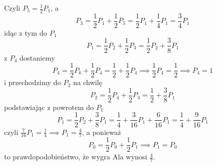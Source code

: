 \begin{solution}
  Czyli $P_5=\frac{1}{2}P_1$, a 
  $$P_3=\frac{1}{2}P_1+\frac{1}{2}P_5=\frac{1}{2}P_1+\frac{1}{4}P_1=\frac{3}{4}P_1$$
  idąc z tym do $P_1$
  $$P_1=\frac{1}{2}P_2+\frac{1}{2}P_3=\frac{1}{2}P_2+\frac{3}{8}P_1$$
  z $P_4$ dostaniemy
  $$P_4=\frac{1}{2} P_6+\frac{1}{2}P_4=\frac{1}{2}+\frac{1}{2}P_4\implies \frac{1}{2}P_4=\frac{1}{2}\implies P_4=1$$
  i przechodzimy do $P_2$ na chwilę
  $$P_2=\frac{1}{2}P_4+\frac{1}{2}P_3=\frac{1}{2}+\frac{3}{8}P_1$$
  podstawiając z powrotem do $P_1$
  $$P_1=\frac{1}{2}P_2+\frac{3}{8}P_1=\frac{1}{4}+\frac{3}{16}P_1+\frac{6}{16}P_1=\frac{1}{4}+\frac{9}{16}P_1$$
  czyli $\frac{7}{16}P_1=\frac{1}{4}\implies P_1=\frac{4}{7}$, a ponieważ
  $$P_0=\frac{1}{2}P_0+\frac{1}{2}P_1\implies P_1=P_0$$
  to prawdopodobieństwo, że wygra Ala wynosi $\frac{4}{7}$.

\end{solution}
